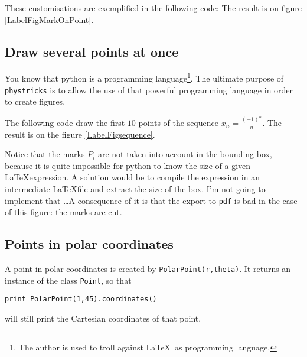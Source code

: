 These customisations are exemplified in the following code:
The result is on figure \ref{LabelFigMarkOnPoint}.
\newcommand{\CaptionFigMarkOnPoint}{A point with a mark. Notice that one can mark the point with any string, including \LaTeX\ code.}

\subsection{Draw several points at once}

You know that python is a programming language\footnote{The author is used to troll against \LaTeX\ as programming language.}. The ultimate purpose of \verb+phystricks+ is to allow the use of that powerful programming language in order to create figures.

The following code draw the first $10$ points of the sequence $x_n=\frac{ (-1)^n }{ n }$.
The result is on the figure \ref{LabelFigsequence}.
\newcommand{\CaptionFigsequence}{The first points of $x_n=(-1)^n/n$.}


Notice that the marks $P_i$ are not taken into account in the bounding box, because it is quite impossible for python to know the size of a given \LaTeX expression. A solution would be to compile the expression in an intermediate \LaTeX file and extract the size of the box. I'm not going to implement that \ldots A consequence of it is that the export to \verb+pdf+ is bad in the case of this figure: the marks are cut.


\subsection{Points in polar coordinates}

A point in polar coordinates is created by \verb+PolarPoint(r,theta)+. It returns an instance of the class \verb+Point+, so that
\begin{verbatim}
print PolarPoint(1,45).coordinates()
\end{verbatim}
will still print the Cartesian coordinates of that point.

